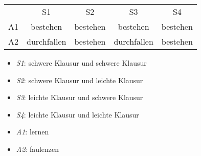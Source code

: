 \begin{tabular}{c|c|c|c|c|}
\multicolumn{1}{c}{}  & \multicolumn{1}{c}{S1}  & \multicolumn{1}{c}{S2}  & \multicolumn{1}{c}{S3}  & \multicolumn{1}{c}{S4} \\ \cline{2-5}
 A1 & bestehen & bestehen & bestehen & bestehen \\ \cline{2-5}
 A2 & durchfallen & bestehen & durchfallen & bestehen \\ \cline{2-5}
\end{tabular}
\begin{itemize}
\item {\em S1}: schwere Klausur und schwere Klausur
\item {\em S2}: schwere Klausur und leichte Klausur
\item {\em S3}: leichte Klausur und schwere Klausur
\item {\em S4}: leichte Klausur und leichte Klausur
\end{itemize}
\begin{itemize}
\item {\em A1}: lernen
\item {\em A2}: faulenzen
\end{itemize}
